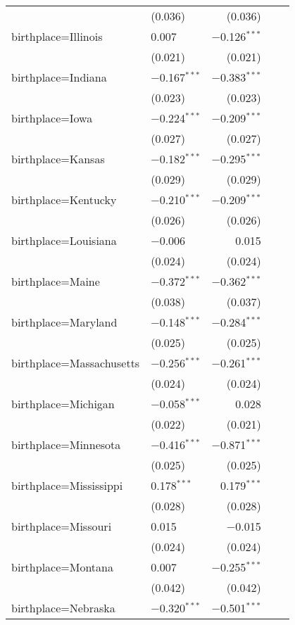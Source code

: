 \begin{longtable}{ll|rrr}
        & (0.036) & (0.036) \\ 
        birthplace=Illinois & 0.007 & $-$0.126$^{***}$ \\ 
        & (0.021) & (0.021) \\ 
        birthplace=Indiana & $-$0.167$^{***}$ & $-$0.383$^{***}$ \\ 
        & (0.023) & (0.023) \\ 
        birthplace=Iowa & $-$0.224$^{***}$ & $-$0.209$^{***}$ \\ 
        & (0.027) & (0.027) \\ 
        birthplace=Kansas & $-$0.182$^{***}$ & $-$0.295$^{***}$ \\ 
        & (0.029) & (0.029) \\ 
        birthplace=Kentucky & $-$0.210$^{***}$ & $-$0.209$^{***}$ \\ 
        & (0.026) & (0.026) \\ 
        birthplace=Louisiana & $-$0.006 & 0.015 \\ 
        & (0.024) & (0.024) \\ 
        birthplace=Maine & $-$0.372$^{***}$ & $-$0.362$^{***}$ \\ 
        & (0.038) & (0.037) \\ 
        birthplace=Maryland & $-$0.148$^{***}$ & $-$0.284$^{***}$ \\ 
        & (0.025) & (0.025) \\ 
        birthplace=Massachusetts & $-$0.256$^{***}$ & $-$0.261$^{***}$ \\ 
        & (0.024) & (0.024) \\ 
        birthplace=Michigan & $-$0.058$^{***}$ & 0.028 \\ 
        & (0.022) & (0.021) \\ 
        birthplace=Minnesota & $-$0.416$^{***}$ & $-$0.871$^{***}$ \\ 
        & (0.025) & (0.025) \\ 
        birthplace=Mississippi & 0.178$^{***}$ & 0.179$^{***}$ \\ 
        & (0.028) & (0.028) \\ 
        birthplace=Missouri & 0.015 & $-$0.015 \\ 
        & (0.024) & (0.024) \\ 
        birthplace=Montana & 0.007 & $-$0.255$^{***}$ \\ 
        & (0.042) & (0.042) \\ 
        birthplace=Nebraska & $-$0.320$^{***}$ & $-$0.501$^{***}$ \\ 

\end{longtable}
